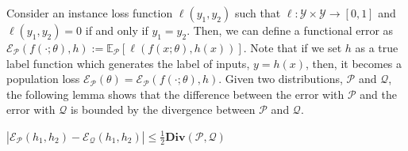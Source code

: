 Consider an instance loss function $\ell(y_{1}, y_{2})$
such that $\ell:\mathcal{Y}\times\mathcal{Y} \rightarrow [0,1]$ and $\ell(y_{1},y_{2})=0$ if and only if $y_{1}=y_{2}$.
Then, we can define a functional error as $\mathcal{E}_{\mathcal{P}}(f(\cdot;\theta),h):=\mathbb{E}_{\mathcal{P}}[\ell(f(x;\theta),h(x))]$.
Note that if we set $h$ as a true label function which generates the label of inputs, $y=h(x)$,
then, it becomes a population loss $\mathcal{E}_{\mathcal{P}}(\theta)=\mathcal{E}_{\mathcal{P}}(f(\cdot;\theta),h)$.
Given two distributions, $\mathcal{P}$ and $\mathcal{Q}$, the following lemma shows that the difference between the error with $\mathcal{P}$ and the error with $\mathcal{Q}$ is bounded by the divergence between $\mathcal{P}$ and $\mathcal{Q}$.
\begin{lemma}\label{lem:bnd_dist}
$\left|\mathcal{E}_{\mathcal{P}}(h_{1},h_{2}) - \mathcal{E}_{\mathcal{Q}}(h_{1},h_{2})\right| \leq \frac{1}{2}\mathbf{Div}(\mathcal{P},\mathcal{Q})$
\end{lemma}
